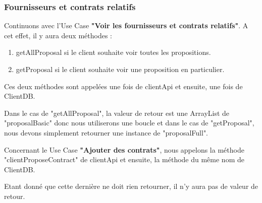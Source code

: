 \newpage

\subsubsection{Fournisseurs et
contrats relatifs}
\begin{flushleft}
Continuons avec l'Use Case \textbf{"Voir les fournisseurs et
contrats relatifs"}.
A cet effet, il y aura deux méthodes :
\end{flushleft}

\begin{enumerate}
\item getAllProposal si le client souhaite voir toutes les propositions.
\item getProposal si le client souhaite voir une proposition en particulier.
\end{enumerate}

\begin{flushleft}
Ces deux méthodes sont appelées une fois de clientApi et ensuite, une fois de ClientDB.
\end{flushleft}

\begin{flushleft}
Dans le cas de "getAllProposal", la valeur de retour est une ArrayList de "proposalBasic" donc nous utiliserons une boucle et dans le cas de "getProposal", nous devons simplement retourner une instance de "proposalFull".
\end{flushleft}

\begin{flushleft}
Concernant le Use Case \textbf{"Ajouter des contrats"}, nous appelons la méthode "clientProposeContract" de clientApi et ensuite, la méthode du même nom de ClientDB.
\end{flushleft}

\begin{flushleft}
Etant donné que cette dernière ne doit rien retourner, il n'y aura pas de valeur de retour.
\end{flushleft}

